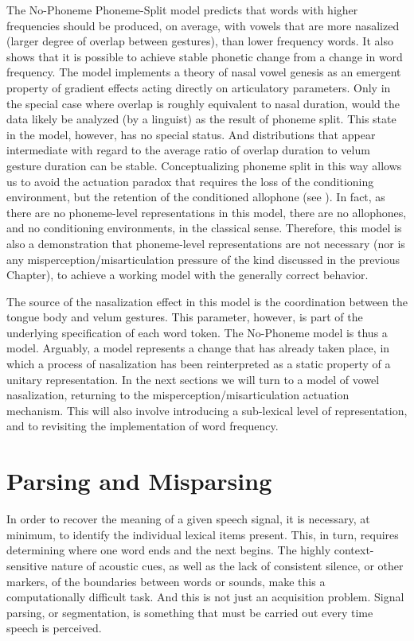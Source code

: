 The No-Phoneme Phoneme-Split model predicts that words with higher
frequencies should be produced, on average, with vowels that are more
nasalized (larger degree of overlap between gestures), than lower
frequency words. It also shows that it is possible to achieve stable
phonetic change from a change in word frequency. The model implements
a theory of nasal vowel genesis as an emergent property of gradient
effects acting directly on articulatory parameters. Only in the special
case where overlap is roughly equivalent to nasal duration, would
the data likely be analyzed (by a linguist) as the result of phoneme
split. This state in the model, however, has no special status. And
distributions that appear intermediate with regard to the average
ratio of overlap duration to velum gesture duration can be stable.
Conceptualizing phoneme split in this way allows us to avoid the actuation
paradox that requires the loss of the conditioning environment, but
the retention of the conditioned allophone (see ).
In fact, as there are no phoneme-level representations in this model,
there are no allophones, and no conditioning environments, in the
classical sense. Therefore, this model is also a demonstration that
phoneme-level representations are not necessary (nor is any misperception/misarticulation
pressure of the kind discussed in the previous Chapter), to achieve
a working model with the generally correct behavior. 

The source of the nasalization effect in this model is the coordination
between the tongue body and velum gestures. This parameter, however,
is part of the underlying specification of each word token. The No-Phoneme
model is thus a  model. Arguably, a  model
represents a change that has already taken place, in which a process
of nasalization has been reinterpreted as a static property of a unitary
representation. In the next sections we will turn to a 
model of vowel nasalization, returning to the misperception/misarticulation
actuation mechanism. This will also involve introducing a sub-lexical
level of representation, and to revisiting the implementation of word
frequency.

\section{Parsing and Misparsing}

In order to recover the meaning of a given speech signal, it is necessary,
at minimum, to identify the individual lexical items present. This,
in turn, requires determining where one word ends and the next begins.
The highly context-sensitive nature of acoustic cues, as well as the
lack of consistent silence, or other markers, of the boundaries between
words or sounds, make this a computationally difficult task. And this
is not just an acquisition problem. Signal parsing, or segmentation,
is something that must be carried out every time speech is perceived. 

